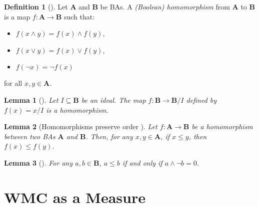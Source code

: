 \documentclass{article}
\newtheorem{lemma}{Lemma}
\theoremstyle{definition}
\newtheorem{definition}{Definition}
\theoremstyle{remark}
\begin{document}
\begin{definition}[\cite{givant2008introduction}]
  Let $\mathbf{A}$ and $\mathbf{B}$ be BAs. A \emph{(Boolean) homomorphism} from
  $\mathbf{A}$ to $\mathbf{B}$ is a map $f\colon \mathbf{A} \to \mathbf{B}$ such
  that:
  \begin{itemize}
  \item $f(x \land y) = f(x) \land f(y)$,
  \item $f(x \lor y) = f(x) \lor f(y)$,
  \item $f(\neg x) = \neg f(x)$
  \end{itemize}
  for all $x, y \in \mathbf{A}$.
\end{definition}

\begin{lemma}[\cite{givant2008introduction}] \label{lemma:canonical_homomorphism}
  Let $I \subseteq \mathbf{B}$ be an ideal. The map $f\colon \mathbf{B} \to
  \mathbf{B}/I$ defined by $f(x) = x/I$ is a homomorphism.
\end{lemma}

\begin{lemma}[Homomorphisms preserve order
  \cite{givant2008introduction}] \label{lemma:homomorphisms_and_order}
  Let $f\colon \mathbf{A} \to \mathbf{B}$ be a homomorphism between two BAs
  $\mathbf{A}$ and $\mathbf{B}$. Then, for any $x, y \in \mathbf{A}$, if $x \le
  y$, then $f(x) \le f(y)$.
\end{lemma}

\begin{lemma}[\cite{sikorski1969boolean}] \label{lemma:order}
  For any $a, b \in \mathbf{B}$, $a \le b$ if and only if $a \land \neg b = 0$.
\end{lemma}


\section{WMC as a Measure}
\end{document}
